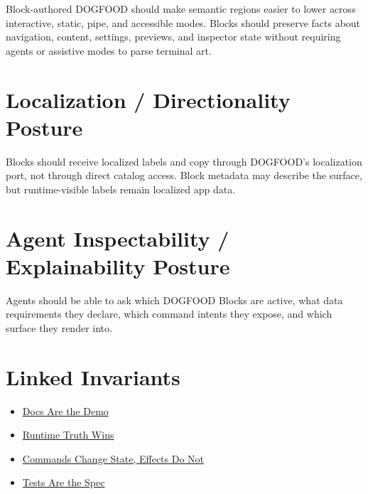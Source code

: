 Block-authored DOGFOOD should make semantic regions easier to lower across interactive, static, pipe, and accessible modes. Blocks should preserve facts about navigation, content, settings, previews, and inspector state without requiring agents or assistive modes to parse terminal art.

\section{Localization / Directionality Posture}\label{record-109-localization-directionality-posture}

Blocks should receive localized labels and copy through DOGFOOD's localization port, not through direct catalog access. Block metadata may describe the surface, but runtime-visible labels remain localized app data.

\section{Agent Inspectability / Explainability Posture}\label{record-109-agent-inspectability-explainability-posture}

Agents should be able to ask which DOGFOOD Blocks are active, what data requirements they declare, which command intents they expose, and which surface they render into.

\section{Linked Invariants}\label{record-109-linked-invariants}

\begin{itemize}
\tightlist
\item
  \href{https://github.com/flyingrobots/bijou/blob/cbd70612140e7a450d764b3c7be1c6af878b99bc/docs/invariants/docs-are-the-demo.md}{Docs Are the Demo}
\item
  \href{https://github.com/flyingrobots/bijou/blob/cbd70612140e7a450d764b3c7be1c6af878b99bc/docs/invariants/runtime-truth-wins.md}{Runtime Truth Wins}
\item
  \href{https://github.com/flyingrobots/bijou/blob/cbd70612140e7a450d764b3c7be1c6af878b99bc/docs/invariants/commands-change-state-effects-do-not.md}{Commands Change State, Effects Do Not}
\item
  \href{https://github.com/flyingrobots/bijou/blob/cbd70612140e7a450d764b3c7be1c6af878b99bc/docs/invariants/tests-are-the-spec.md}{Tests Are the Spec}
\end{itemize}

